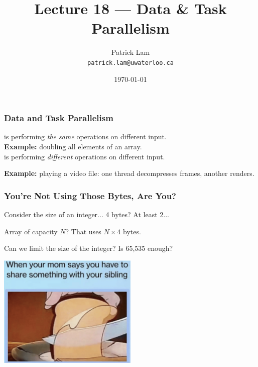 

\title{Lecture 18 --- Data \& Task Parallelism }

\author{Patrick Lam \\ \small \texttt{patrick.lam@uwaterloo.ca}}
\date{\today}




\begin{frame}
  \titlepage

 \end{frame}


\begin{frame}
  \frametitle{Data and Task Parallelism}

  
      is performing \emph{the same} operations on
      different input.\\

     {\bf Example:} doubling all elements of an array.\\[1em]

      is performing \emph{different} operations
      on different input.

    {\bf Example:} playing a video file: one thread decompresses
      frames, another renders.

  
\end{frame}


\begin{frame}
\frametitle{You're Not Using Those Bytes, Are You?}

Consider the size of an integer... 4 bytes? At least 2...

Array of capacity $N$? That uses $N \times 4$ bytes.

Can we limit the size of the integer? Is 65,535 enough?

\begin{center}
	\includegraphics[width=0.5\textwidth]{images/havetoshare.png}
\end{center}

\end{frame}


